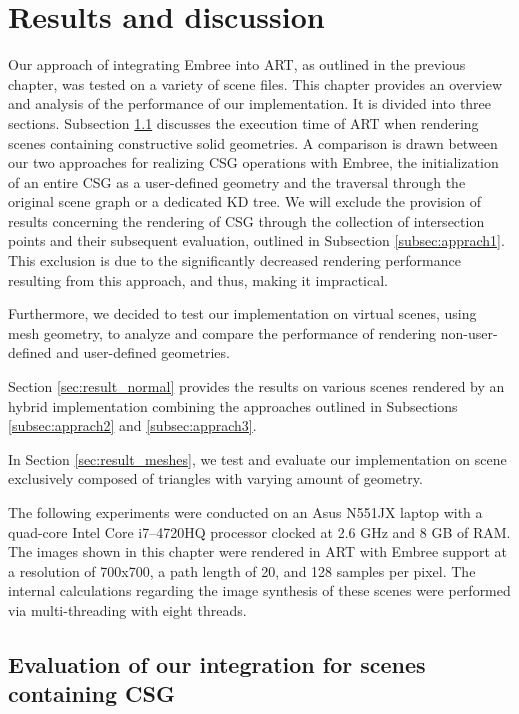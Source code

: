 \chapter{Results and discussion}
\label{chap:results}

Our approach of integrating Embree into ART, as outlined in the previous chapter, was tested on a variety of scene files. This chapter provides an overview and analysis of the performance of our implementation. It is divided into three sections. Subsection \ref{sec:results_csg} discusses the execution time of ART when rendering scenes containing constructive solid geometries. A comparison is drawn between our two approaches for realizing CSG operations with Embree, the initialization of an entire CSG as a user-defined geometry and the traversal through the original scene graph or a dedicated KD tree. We will exclude the provision of results concerning the rendering of CSG through the collection of intersection points and their subsequent evaluation, outlined in Subsection \ref{subsec:apprach1}. This exclusion is due to the significantly decreased rendering performance resulting from this approach, and thus, making it impractical.

Furthermore, we decided to test our implementation on virtual scenes, using mesh geometry, to analyze and compare the performance of rendering non-user-defined and user-defined geometries. 

Section \ref{sec:result_normal} provides the results on various scenes rendered by an hybrid implementation combining the approaches outlined in Subsections \ref{subsec:apprach2} and \ref{subsec:apprach3}. 

In Section \ref{sec:result_meshes}, we test and evaluate our implementation on scene exclusively composed of triangles with varying amount of geometry.

The following experiments were conducted on an Asus N551JX laptop with a quad-core Intel Core i7–4720HQ processor clocked at 2.6 GHz and 8 GB of RAM. The images shown in this chapter were rendered in ART with Embree support at a resolution of 700x700, a path length of 20, and 128 samples per pixel. The internal calculations regarding the image synthesis of these scenes were performed via multi-threading with eight threads.

\section{Evaluation of our integration for scenes containing CSG}
\label{sec:results_csg}

